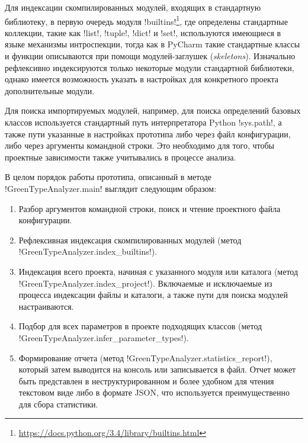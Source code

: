 Для индексации скомпилированных модулей, входящих в стандартную библиотеку, в
первую очередь модуля
!builtins!\footnote{\url{https://docs.python.org/3.4/library/builtins.html}},
где определены стандартные коллекции, такие как !list!, !tuple!, !dict! и !set!,
используются имеющиеся в языке механизмы интроспекции, тогда как в PyCharm
такие стандартные классы и функции описываются при помощи модулей-заглушек
(\emph{skeletons}).
Изначально рефлексивно индексируются только некоторые модули стандартной
библиотеки, однако имеется возможность указать в настройках для конкретного
проекта дополнительные модули.

Для поиска импортируемых модулей, например, для поиска определений базовых
классов используется стандартный путь интерпретатора Python !sys.path!, а также пути
указанные в настройках прототипа либо через файл конфигурации, либо через
аргументы командной строки. Это необходимо для того, чтобы проектные
зависимости также учитывались в процессе анализа.

В целом порядок работы прототипа, описанный в методе !GreenTypeAnalyzer.main! 
выглядит следующим образом:

\begin{enumerate}
    \item Разбор аргументов командной строки, поиск и чтение проектного файла
      конфигурации.

    \item Рефлексивная индексация скомпилированных модулей (метод
      !GreenTypeAnalyzer.index_builtins!).

    \item Индексация всего проекта, начиная с указанного модуля или каталога 
      (метод !GreenTypeAnalyzer.index_project!).
      Включаемые и исключаемые из процесса индексации файлы и каталоги, а также
      пути для поиска модулей настраиваются. 

    \item Подбор для всех параметров в проекте подходящих классов (метод
      !GreenTypeAnalyzer.infer_parameter_types!).

    \item Формирование отчета (метод !GreenTypeAnalyzer.statistics_report!),
      который затем выводится на консоль или записывается в файл. Отчет может
      быть представлен в неструктурированном и более удобном для чтения
      текстовом виде либо в формате JSON, что используется преимущественно для
      сбора статистики. 

\end{enumerate}

